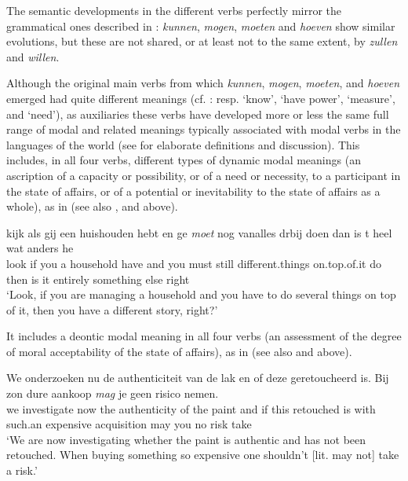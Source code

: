 \documentclass[output=paper]{langsci/langscibook}
\begin{document}
The semantic developments in the different verbs perfectly mirror the grammatical ones described in : \textit{kunnen}, \textit{mogen}, \textit{moeten} and \textit{hoeven} show similar evolutions, but these are not shared, or at least not to the same extent, by \textit{zullen} and \textit{willen}.

Although the original main verbs from which \textit{kunnen}, \textit{mogen}, \textit{moeten}, and \textit{hoeven} emerged had quite different meanings (cf. : resp. ‘know’, ‘have power’, ‘measure’, and ‘need’), as auxiliaries these verbs have developed more or less the same full range of modal and related meanings typically associated with modal verbs in the languages of the world (see \citealt{Nuyts2006,Nuyts2016} for elaborate definitions and discussion). This includes, in all four verbs, different types of dynamic modal meanings (an ascription of a capacity or possibility, or of a need or necessity, to a participant in the state of affairs, or of a potential or inevitability to the state of affairs as a whole), as in  (see also ,  and  above).

\ea%
    \label{ex:nuyts:12}
    \gll           kijk als gij een huishouden hebt en ge \textit{moet} nog vanalles d{\textquotesingle}rbij doen dan is {\textquotesingle}t heel wat anders he\\
  look if you a household have and you must still different.things on.top.of.it do then is it entirely something else right\\
\glt   `Look, if you are managing a household and you have to do several things on top of it, then you have a different story, right?'
\z

It includes a deontic modal meaning in all four verbs (an assessment of the degree of moral acceptability of the state of affairs), as in  (see also  and  above).

\ea%
    \label{ex:nuyts:13}
\gll          We onderzoeken nu de authenticiteit van de lak en of deze geretoucheerd is. Bij zo{\textquotesingle}n dure aankoop \textit{mag} je geen risico nemen.\\
  we investigate now the authenticity of the paint and if this retouched is with such.an expensive acquisition may you no risk take\\
\glt  `We are now investigating whether the paint is authentic and has not been retouched. When buying something so expensive one shouldn’t [lit. may not] take a risk.' 
  \z
\end{document}
